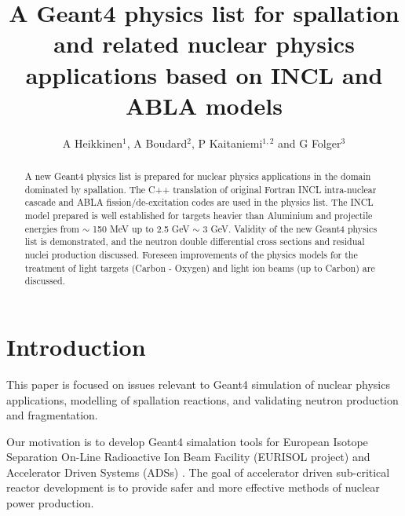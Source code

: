 \documentclass[a4paper]{jpconf}
\begin{document}
\title{A Geant4 physics list for spallation and related nuclear physics applications 
based on INCL and ABLA models}

\author{A Heikkinen$^1$, A Boudard$^2$, P Kaitaniemi$^{1,2}$ and G Folger$^3$}
\address{$^1$ Helsinki Institute of Physics, P.O. Box 64, FIN-00014 University of Helsinki, Finland}
\address{$^2$ CEN-Saclay, CEA-IRFU/SPhN, 91 191 Gif sur Yvette, France}
\address{$^3$ European Organization for Nuclear Research (CERN), Switzerland}


\begin{abstract}
A new Geant4 physics list is prepared for nuclear physics applications
in the domain dominated by spallation.
The C++ translation of original Fortran INCL intra-nuclear 
cascade and ABLA fission/de-excitation codes 
are used in the physics list.
The INCL model prepared is well established for targets heavier than Aluminium
and projectile energies from $\sim$ 150 MeV up to 2.5 GeV $\sim$ 3 GeV.
Validity of the new Geant4 physics list is demonstrated, 
and the neutron double differential cross sections and residual nuclei production discussed.
Foreseen improvements of the physics models for the treatment of light targets (Carbon - Oxygen)
and light ion beams (up to Carbon) are discussed.
\end{abstract}

\section{Introduction} \label{sec:intro}
This paper is focused on issues relevant to Geant4 \cite{geant4} simulation of nuclear physics applications,
modelling of spallation reactions, and validating neutron production and fragmentation.

Our motivation is to develop Geant4 simalation tools for European Isotope Separation On-Line
Radioactive Ion Beam Facility (EURISOL project) \cite{eurisol} and 
Accelerator Driven Systems (ADSs) \cite{ads}. 
The goal of accelerator driven sub-critical reactor development is to provide safer and more effective
methods of nuclear power production. 
\end{document}
